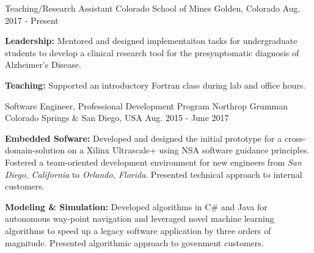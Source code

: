 

\begin{cventries}

  \cventry
    {Teaching/Research Assistant} %
    {Colorado School of Mines} %
    {Golden, Colorado} %
    {Aug. 2017 - Present} %
    {
      \begin{cvitems} %
        \item {\textbf{Leadership:} Mentored and designed implementaiton tasks for undergraduate students to develop a clinical research tool for the presynptomatic diagnosis of Alzheimer's Disease.}
        \item {\textbf{Teaching:} Supported an introductory Fortran class during lab and office hours.}
      \end{cvitems}
    }
  \cventry
    {Software Engineer, Professional Development Program}
    {Northrop Grumman}
    {Colorado Springs \& San Diego, USA}
    {Aug. 2015 - June 2017}
    {
      \begin{cvitems}
      \item \textbf{Embedded Sofware:} Developed and designed the initial prototype for a cross-domain-solution on a Xilinx Ultrascale+ using NSA software guidance principles. Fostered a team-oriented development environment for new engineers from \textit{San Diego, California} to \textit{Orlando, Florida}. Presented technical approach to internal customers. 
        \item \textbf{Modeling \& Simulation:} Developed algorithms in C\# and Java for autonomous way-point navigation and leveraged novel machine learning algorithms to speed up a legacy software application by three orders of magnitude. Presented algorithmic approach to govenment customers.
      \end{cvitems}
    }

\end{cventries}
